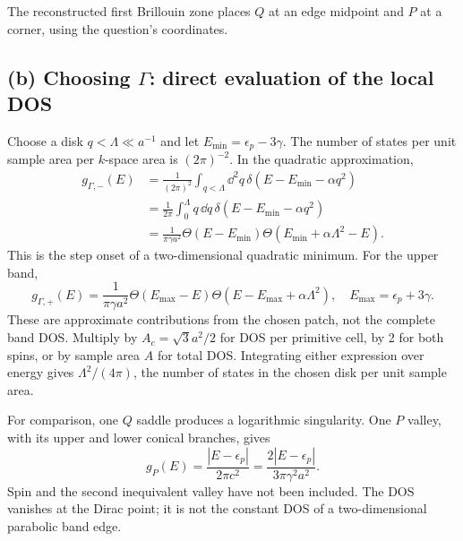 \begin{center}
\begin{minipage}{0.95\linewidth}
\centering
{}
\par\small
The reconstructed first Brillouin zone places $Q$ at an edge midpoint and $P$ at a corner, using the question's coordinates.
\end{minipage}
\end{center}

\subsection*{(b) Choosing $\Gamma$: direct evaluation of the local DOS}
Choose a disk $q<\Lambda\ll a^{-1}$ and let $E_{\min}=\epsilon_p-3\gamma$. The number of states per unit sample area per $k$-space area is $(2\pi)^{-2}$. In the quadratic approximation,
\begin{align*}
g_{\Gamma,-}(E)
&=\frac1{(2\pi)^2}\int_{q<\Lambda}\dd^2q\,
\delta(E-E_{\min}-\alpha q^2)\\
&=\frac1{2\pi}\int_0^\Lambda q\,\dd q\,
\delta(E-E_{\min}-\alpha q^2)\\
&=\boxed{\frac1{\pi\gamma a^2}
\Theta(E-E_{\min})\Theta(E_{\min}+\alpha\Lambda^2-E).}
\end{align*}
This is the step onset of a two-dimensional quadratic minimum. For the upper band,
\[
g_{\Gamma,+}(E)=\frac1{\pi\gamma a^2}
\Theta(E_{\max}-E)\Theta(E-E_{\max}+\alpha\Lambda^2),
\quad E_{\max}=\epsilon_p+3\gamma.
\]
These are approximate contributions from the chosen patch, not the complete band DOS. Multiply by $A_c=\sqrt3a^2/2$ for DOS per primitive cell, by 2 for both spins, or by sample area $A$ for total DOS. Integrating either expression over energy gives $\Lambda^2/(4\pi)$, the number of states in the chosen disk per unit sample area.

For comparison, one $Q$ saddle produces a logarithmic singularity. One $P$ valley, with its upper and lower conical branches, gives
\[
g_P(E)=\frac{|E-\epsilon_p|}{2\pi c^2}
=\frac{2|E-\epsilon_p|}{3\pi\gamma^2a^2}.
\]
Spin and the second inequivalent valley have not been included. The DOS vanishes at the Dirac point; it is not the constant DOS of a two-dimensional parabolic band edge.

